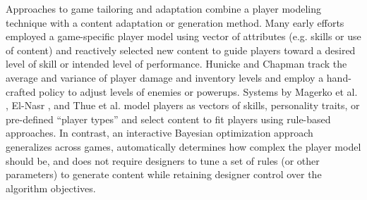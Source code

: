 \documentclass{sig-alternate}
\begin{document}

Approaches to game tailoring and adaptation combine a player modeling technique with a content adaptation or generation method. 
Many early efforts employed a game-specific player model using vector of attributes (e.g. skills or use of content) and reactively selected new content to guide players toward a desired level of skill or intended level of performance. 
Hunicke and Chapman \cite{hunicke2004:dda} track the average and variance of player damage and inventory levels and employ a hand-crafted policy to adjust levels of enemies or powerups. 
Systems by Magerko et al. \cite{magerko2006:isat}, El-Nasr \cite{seifel-nasr2007:mirage}, and Thue et al. \cite{thue2007:storytell-pm} model players as vectors of skills, personality traits, or pre-defined ``player types'' and select content to fit players using rule-based approaches. 
In contrast, an interactive Bayesian optimization approach generalizes across games, automatically determines how complex the player model should be, and does not require designers to tune a set of rules (or other parameters) to generate content while retaining designer control over the algorithm objectives. 


\end{document}
